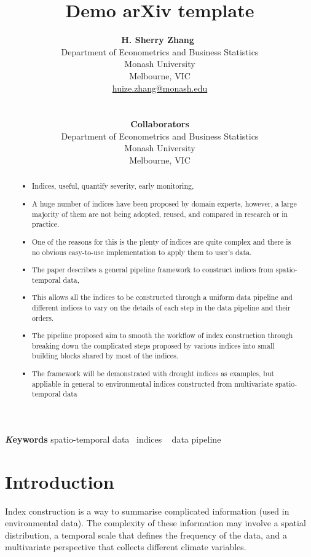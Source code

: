 \documentclass[
]{article}
\title{Demo arXiv template}
\author{
\textbf{H. Sherry Zhang}~\orcidlink{0000-0002-7122-1463}\\Department of
Econometrics and Business Statistics\\Monash University\\Melbourne,
VIC\\\href{mailto:huize.zhang@monash.edu}{huize.zhang@monash.edu}\\\\\\
\textbf{Collaborators}\\Department of Econometrics and Business
Statistics\\Monash University\\Melbourne, VIC\\}
\date{}
\providecommand{\tightlist}{%
  \setlength{\itemsep}{0pt}\setlength{\parskip}{0pt}}\usepackage{longtable,booktabs,array}
\begin{document}
\maketitle
\begin{abstract}
\begin{itemize}
\tightlist
\item
  Indices, useful, quantify severity, early monitoring,
\item
  A huge number of indices have been proposed by domain experts,
  however, a large majority of them are not being adopted, reused, and
  compared in research or in practice.
\item
  One of the reasons for this is the plenty of indices are quite complex
  and there is no obvious easy-to-use implementation to apply them to
  user's data.
\item
  The paper describes a general pipeline framework to construct indices
  from spatio-temporal data,
\item
  This allows all the indices to be constructed through a uniform data
  pipeline and different indices to vary on the details of each step in
  the data pipeline and their orders.
\item
  The pipeline proposed aim to smooth the workflow of index construction
  through breaking down the complicated steps proposed by various
  indices into small building blocks shared by most of the indices.
\item
  The framework will be demonstrated with drought indices as examples,
  but appliable in general to environmental indices constructed from
  multivariate spatio-temporal data
\end{itemize}
\end{abstract}
{\bfseries \emph Keywords}
\def\sep{\textbullet\ }
spatio-temporal data \sep indices \sep 
data pipeline

\ifdefined\Shaded\renewenvironment{Shaded}{\begin{tcolorbox}[enhanced, borderline west={3pt}{0pt}{shadecolor}, breakable, sharp corners, boxrule=0pt, interior hidden, frame hidden]}{\end{tcolorbox}}\fi

\hypertarget{introduction}{%
\section{Introduction}\label{introduction}}

Index construction is a way to summarise complicated information (used
in environmental data). The complexity of these information may involve
a spatial distribution, a temporal scale that defines the frequency of
the data, and a multivariate perspective that collects different climate
variables.
\end{document}

